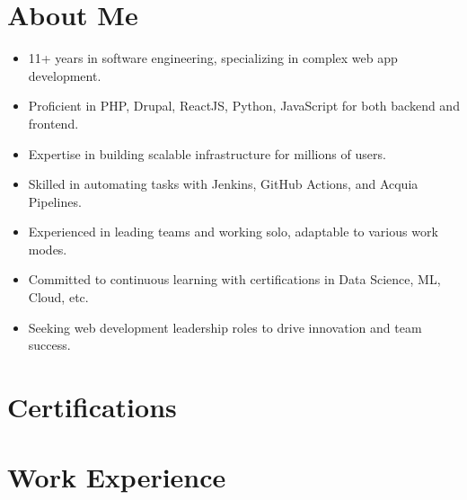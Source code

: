 \documentclass[12pt,a4paper,sans]{moderncv}
\begin{document}
\vspace*{-2\baselineskip}
\maketitle
\vspace{-1.5\baselineskip}


\section{About Me}
\begin{itemize}
\item 11+ years in software engineering, specializing in complex web app development.
\item Proficient in PHP, Drupal, ReactJS, Python, JavaScript for both backend and frontend.
\item Expertise in building scalable infrastructure for millions of users.
\item Skilled in automating tasks with Jenkins, GitHub Actions, and Acquia Pipelines.
\item Experienced in leading teams and working solo, adaptable to various work modes.
\item Committed to continuous learning with certifications in Data Science, ML, Cloud, etc.
\item Seeking web development leadership roles to drive innovation and team success.
\end{itemize}

\section{Certifications}

\section{Work Experience}
\end{document}
